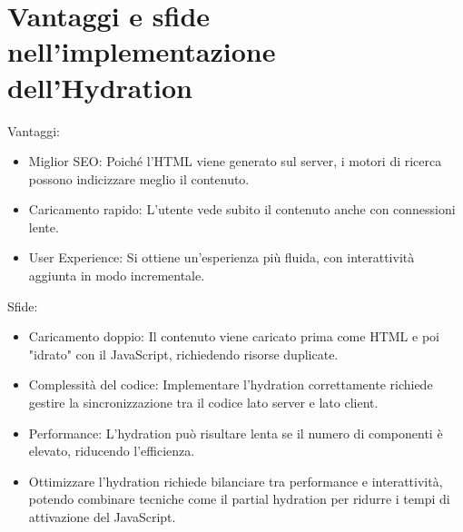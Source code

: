 \section{Vantaggi e sfide nell'implementazione dell'Hydration}
Vantaggi:
\begin{itemize}
    \item Miglior SEO: Poiché l'HTML viene generato sul server, i motori di ricerca possono indicizzare meglio il contenuto.
    \item Caricamento rapido: L'utente vede subito il contenuto anche con connessioni lente.
    \item User Experience: Si ottiene un'esperienza più fluida, con interattività aggiunta in modo incrementale.
\end{itemize}

Sfide:
\begin{itemize}
    \item Caricamento doppio: Il contenuto viene caricato prima come HTML e poi "idrato" con il JavaScript, richiedendo risorse duplicate.
    \item Complessità del codice: Implementare l'hydration correttamente richiede gestire la sincronizzazione tra il codice lato server e lato client.
    \item Performance: L'hydration può risultare lenta se il numero di componenti è elevato, riducendo l'efficienza.
    \item Ottimizzare l'hydration richiede bilanciare tra performance e interattività, potendo combinare tecniche come il partial hydration per ridurre i tempi di attivazione del JavaScript.
\end{itemize}